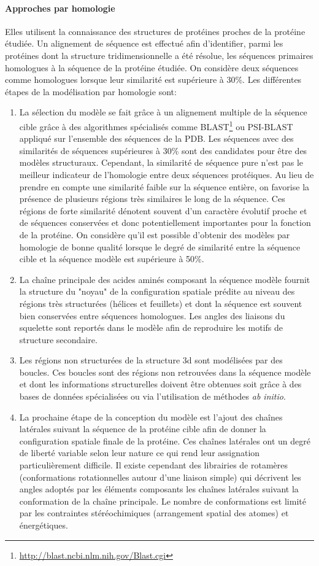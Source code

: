 \paragraph{Approches par homologie} 
Elles utilisent la connaissance des structures de protéines proches de la protéine étudiée. Un alignement de séquence est effectué afin d'identifier, parmi les protéines dont la structure tridimensionnelle a été résolue, les séquences primaires homologues à la séquence de la protéine étudiée. On considère deux séquences comme homologues lorsque leur similarité est supérieure à 30\%. Les différentes étapes de la modélisation par homologie sont:
\begin{enumerate}
	\item La sélection du modèle se fait grâce à un alignement multiple de la séquence cible grâce à des algorithmes spécialisés comme BLAST\footnote{\url{http://blast.ncbi.nlm.nih.gov/Blast.cgi}} ou PSI-BLAST appliqué sur l'ensemble des séquences de la PDB. Les séquences avec des similarités de séquences supérieures à 30\% sont des candidates pour être des modèles structuraux. Cependant, la similarité de séquence pure n'est pas le meilleur indicateur de l'homologie entre deux séquences protéiques. Au lieu de prendre en compte une similarité faible sur la séquence entière, on favorise la présence de plusieurs régions très similaires le long de la séquence. Ces régions de forte similarité dénotent souvent d'un caractère évolutif proche et de séquences conservées et donc potentiellement importantes pour la fonction de la protéine. On considère qu'il est possible d'obtenir des modèles par homologie de bonne qualité lorsque le degré de similarité entre la séquence cible et la séquence modèle est supérieure à 50\%.
	\item La chaîne principale des acides aminés composant la séquence modèle fournit la structure du "noyau" de la configuration spatiale prédite au niveau des régions très structurées (hélices et feuillets) et dont la séquence est souvent bien conservées entre séquences homologues. Les angles des liaisons du squelette sont reportés dans le modèle afin de reproduire les motifs de structure secondaire.
	\item Les régions non structurées de la structure 3d sont modélisées par des boucles. Ces boucles sont des régions non retrouvées dans la séquence modèle et dont les informations structurelles doivent être obtenues soit grâce à des bases de données spécialisées ou via l'utilisation de méthodes \textit{ab initio}.
	\item La prochaine étape de la conception du modèle est l'ajout des chaînes latérales suivant la séquence de la protéine cible afin de donner la configuration spatiale finale de la protéine. Ces chaînes latérales ont un degré de liberté variable selon leur nature ce qui rend leur assignation particulièrement difficile. Il existe cependant des librairies de rotamères (conformations rotationnelles autour d'une liaison simple) qui décrivent les angles adoptés par les éléments composants les chaînes latérales suivant la conformation de la chaîne principale. Le nombre de conformations est limité par les contraintes stéréochimiques (arrangement spatial des atomes) et énergétiques.

\end{enumerate}
